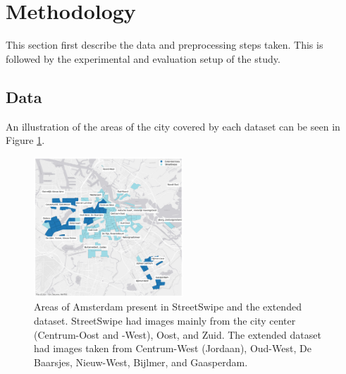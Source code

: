 \section{Methodology}
\label{sec:methodology}

This section first describe the data and preprocessing steps taken. This is followed by the experimental and evaluation setup of the study.

\subsection{Data}

An illustration of the areas of the city covered by each dataset can be seen in Figure \ref{fig:map}.

\begin{figure}[h]
    \centering
    \includegraphics[width=0.5\textwidth
]{media/methodology/map1.png}
    \setlength{\belowcaptionskip}{-10pt}
    \caption{Areas of Amsterdam present in StreetSwipe and the extended dataset. StreetSwipe had images mainly from the city center (Centrum-Oost and -West), Oost, and Zuid. The extended dataset had images taken from Centrum-West (Jordaan), Oud-West, De Baarsjes, Nieuw-West, Bijlmer, and Gaasperdam.}
    \label{fig:map}
\end{figure}

